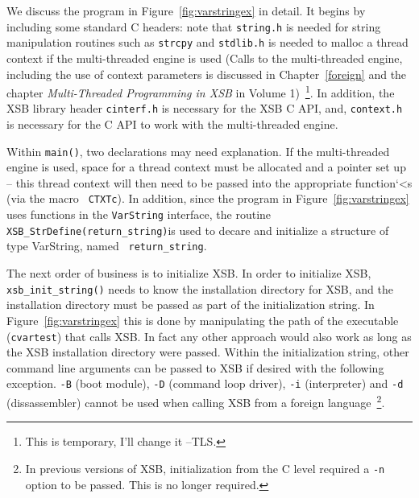 We discuss the program in Figure~\ref{fig:varstringex} in detail.  It
begins by including some standard C headers: note that {\tt string.h}
is needed for string manipulation routines such as {\tt strcpy} and
{\tt stdlib.h} is needed to malloc a thread context if the
multi-threaded engine is used (Calls to the multi-threaded engine,
including the use of context parameters is discussed in
Chapter~\ref{foreign} and the chapter {\em Multi-Threaded Programming
  in XSB} in Volume 1)~\footnote{This is temporary, I'll change it
  --TLS.}.  In addition, the XSB library header {\tt cinterf.h} is
necessary for the XSB C API, and, {\tt context.h} is necessary for the
C API to work with the multi-threaded engine.

Within {\tt main()}, two declarations may need explanation.  If the
multi-threaded engine is used, space for a thread context must be
allocated and a pointer set up -- this thread context will then need
to be passed into the appropriate function`<s (via the macro {\tt
  CTXTc}).  In addition, since the program in
Figure~\ref{fig:varstringex} uses functions in the {\tt VarString}
interface, the routine {\tt XSB\_StrDefine(return\_string)}is used to
decare and initialize a structure of type VarString, named {\tt
  return\_string}.

The next order of business is to initialize XSB.  In order to
initialize XSB, {\tt xsb\_init\_string()} needs to know the
installation directory for XSB, and the installation directory must be
passed as part of the initialization string.  In
Figure~\ref{fig:varstringex} this is done by manipulating the path of
the executable ({\tt cvartest}) that calls XSB.  In fact any other
approach would also work as long as the XSB installation directory
were passed.  Within the initialization string, other command line
arguments can be passed to XSB if desired with the following
exception.  {\tt -B} (boot module), {\tt -D} (command loop driver),
{\tt -i} (interpreter) and {\tt -d} (dissassembler) cannot be used
when calling XSB from a foreign language~\footnote{In previous
  versions of XSB, initialization from the C level required a {\tt -n}
  option to be passed.  This is no longer required.}.

